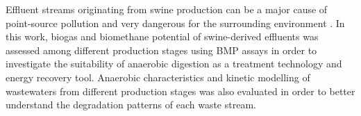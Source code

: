 Effluent streams originating from swine production can be a major cause of point-source pollution and very dangerous for the surrounding environment . In this work, biogas and biomethane potential of swine-derived effluents was assessed among different production stages using BMP assays in order to investigate the suitability of anaerobic digestion as a treatment technology and energy recovery tool. Anaerobic characteristics and kinetic modelling of wastewaters from different production stages was also evaluated in order to better understand the degradation patterns of each waste stream.
